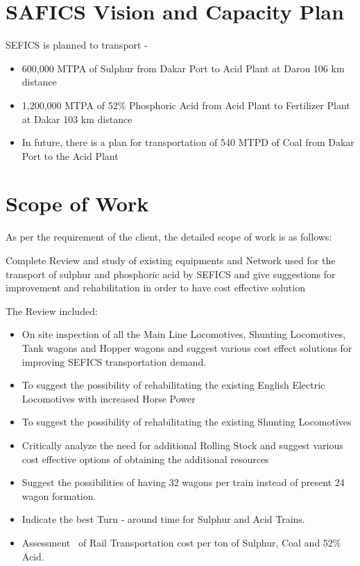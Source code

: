 \section{SAFICS Vision and Capacity Plan}
SEFICS is planned to transport -

\begin{itemize}
\item {\color{black} 600,000 MTPA of Sulphur from Dakar Port to Acid Plant at Darou 106 km distance }
\item {\color{black} 1,200,000 MTPA of 52\% Phosphoric Acid from Acid Plant to Fertilizer Plant at Dakar 103 km distance}
\item {\color{black} In future, there is a plan for transportation of 540 MTPD of Coal from Dakar Port to the Acid Plant}
\end{itemize}

\section{Scope of Work}

As per the requirement of the client, the detailed scope of work is as follows:

\noindent
\begin{textbf}
Complete Review and study of existing equipments and
Network used for the transport of sulphur and phosphoric acid by SEFICS
and give suggestions for improvement and rehabilitation in order to
have cost effective solution
\end{textbf}

\vskip 1cm

The Review included:

\begin{itemize}
\item On site inspection of all the Main Line Locomotives, Shunting
Locomotives, Tank wagons and Hopper wagons and suggest various cost
effect solutions for improving SEFICS transportation demand.
\item To suggest the possibility of rehabilitating the existing English
Electric Locomotives with increased Horse Power
\item To suggest the possibility of rehabilitating the existing Shunting
Locomotives 
\item Critically analyze the need for additional Rolling Stock and
suggest various cost effective options of obtaining the additional
resources
\item Suggest the possibilities of having 32 wagons per train instead of
present 24 wagon formation.
\item Indicate the best Turn - around time for Sulphur and Acid Trains.
\item Assessment \ of Rail Transportation cost per ton of Sulphur, Coal
and 52\% Acid.
\end{itemize}
